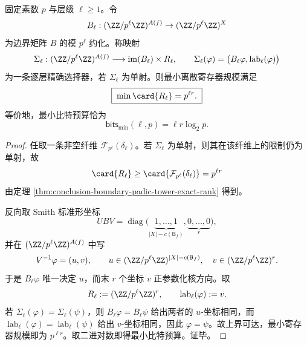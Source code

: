 \begin{theorem}[逐层精确选择器的最小离散复杂度]\label{thm:conclusion-boundary-exact-selector-complexity}
固定素数 \(p\) 与层级 \(\ell\ge 1\)。令
\[
B_\ell:(\ZZ/p^\ell\ZZ)^{A(f)}\to (\ZZ/p^\ell\ZZ)^X
\]
为边界矩阵 \(B\) 的模 \(p^\ell\) 约化。称映射
\[
\Sigma_\ell:(\ZZ/p^\ell\ZZ)^{A(f)}\longrightarrow \operatorname{im}(B_\ell)\times R_\ell,
\qquad
\Sigma_\ell(\varphi)=\bigl(B_\ell\varphi,\operatorname{lab}_\ell(\varphi)\bigr)
\]
为一条逐层精确选择器，若 \(\Sigma_\ell\) 为单射。则最小离散寄存器规模满足
\[
\boxed{\;
\min \card{R_\ell}=p^{\ell r}.
\;}
\]
等价地，最小比特预算恰为
\[
\boxed{\;
\mathsf{bits}_{\min}(\ell,p)=\ell r\log_2 p.
\;}
\]
\end{theorem}
\begin{proof}
任取一条非空纤维 \(\mathcal F_{p^\ell}(\delta_\ell)\)。若 \(\Sigma_\ell\) 为单射，则其在该纤维上的限制仍为单射，故
\[
\card{R_\ell}\ge \card{\mathcal F_{p^\ell}(\delta_\ell)}=p^{\ell r}
\]
由定理 \ref{thm:conclusion-boundary-padic-tower-exact-rank} 得到。

反向取 Smith 标准形坐标
\[
UBV=
\operatorname{diag}\!\bigl(
\underbrace{1,\dots,1}_{|X|-c(\mathsf B_f)},
\underbrace{0,\dots,0}_{r}
\bigr),
\]
并在 \((\ZZ/p^\ell\ZZ)^{A(f)}\) 中写
\[
V^{-1}\varphi=(u,v),
\qquad
u\in(\ZZ/p^\ell\ZZ)^{|X|-c(\mathsf B_f)},
\quad
v\in(\ZZ/p^\ell\ZZ)^r.
\]
于是 \(B_\ell\varphi\) 唯一决定 \(u\)，而末 \(r\) 个坐标 \(v\) 正参数化核方向。取
\[
R_\ell:=(\ZZ/p^\ell\ZZ)^r,
\qquad
\operatorname{lab}_\ell(\varphi):=v.
\]
若 \(\Sigma_\ell(\varphi)=\Sigma_\ell(\psi)\)，则 \(B_\ell\varphi=B_\ell\psi\) 给出两者的 \(u\)-坐标相同，而 \(\operatorname{lab}_\ell(\varphi)=\operatorname{lab}_\ell(\psi)\) 给出 \(v\)-坐标相同，因此 \(\varphi=\psi\)。故上界可达，最小寄存器规模即为 \(p^{\ell r}\)。取二进对数即得最小比特预算。证毕。
\end{proof}

